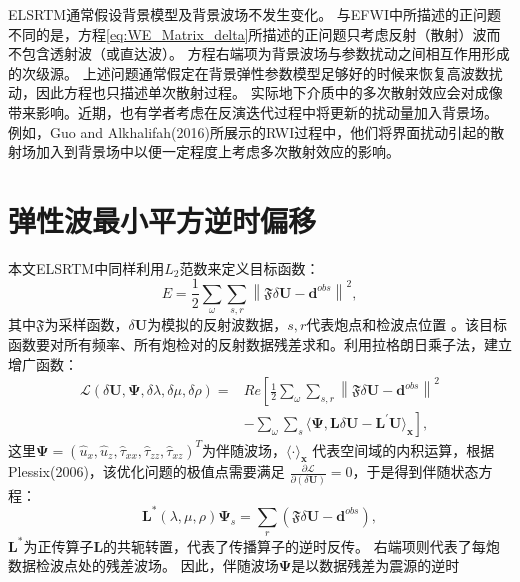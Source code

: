 ELSRTM通常假设背景模型及背景波场不发生变化。%
与EFWI中所描述的正问题不同的是，方程\eqref{eq:WE_Matrix_delta}所描述的正问题只考虑反射（散射）波而不包含透射波（或直达波）。
方程右端项为背景波场与参数扰动之间相互作用形成的次级源。
上述问题通常假定在背景弹性参数模型足够好的时候来恢复高波数扰动，因此方程也只描述单次散射过程。
实际地下介质中的多次散射效应会对成像带来影响。近期，也有学者考虑在反演迭代过程中将更新的扰动量加入背景场。
例如，Guo and
Alkhalifah(2016)\cite{Guo2016}所展示的RWI过程中，他们将界面扰动引起的散射场加入到背景场中以便一定程度上考虑多次散射效应的影响。
\section{弹性波最小平方逆时偏移}
本文ELSRTM中同样利用$L_2$范数来定义目标函数：
\begin{equation}
    E=\frac{1}{2}\sum_{\omega}\sum_{s,r}\left\lVert \mathfrak{F}\delta \mathbf{U}-\mathbf{d}^{obs} \right \rVert^2,
    \label{eq:misfit_LSRTM}
\end{equation}
其中$\mathfrak{F}$为采样函数，$\delta\mathbf{U}$为模拟的反射波数据，$s,r$代表炮点和检波点位置
。该目标函数要对所有频率、所有炮检对的反射数据残差求和。利用拉格朗日乘子法，建立增广函数：
\begin{equation}
\begin{split}
    \mathcal{L}(\delta\mathbf{U},\bm\Psi,\delta\lambda,\delta\mu,\delta\rho)=&Re\left[
	\frac{1}{2}\sum_{\omega}\sum_{s,r}\left\lVert \mathfrak{F}\delta \mathbf{U}-\mathbf{d}^{obs} \right \rVert^2 \right. \\
	&\left.-\sum_{\omega}\sum_{s}\langle\bm\Psi,\mathbf{L}\delta\mathbf{U}-\mathbf{L}^{'}\mathbf{U}\rangle_{\mathbf{x}}\right],
    \label{eq:Lagrangian_LSRTM}
\end{split}
\end{equation}
这里$\bm\Psi=(\hat {u}_x,\hat {u}_z,\hat{\tau}_{xx},\hat{\tau}_{zz},\hat{\tau}_{xz})^T$为伴随波场，$\langle\cdot\rangle_\mathbf{x}$
代表空间域的内积运算，根据Plessix(2006)\cite{plessix2006}，该优化问题的极值点需要满足
$\frac{\partial\mathcal{L}}{\partial(\delta\mathbf{U})}=0$，于是得到伴随状态方程：
\begin{equation}
	\mathbf{L}^*(\lambda,\mu,\rho)\bm\Psi_s=\sum_{r}(\mathfrak{F}\delta\mathbf{U}-\mathbf{d}^{obs}),
    \label{eq:Adjoint_LSRTM} 
\end{equation}
$\mathbf{L}^*$为正传算子$\mathbf{L}$的共轭转置，代表了传播算子的逆时反传。
右端项则代表了每炮数据检波点处的残差波场。
因此，伴随波场$\bm\Psi$是以数据残差为震源的逆时
